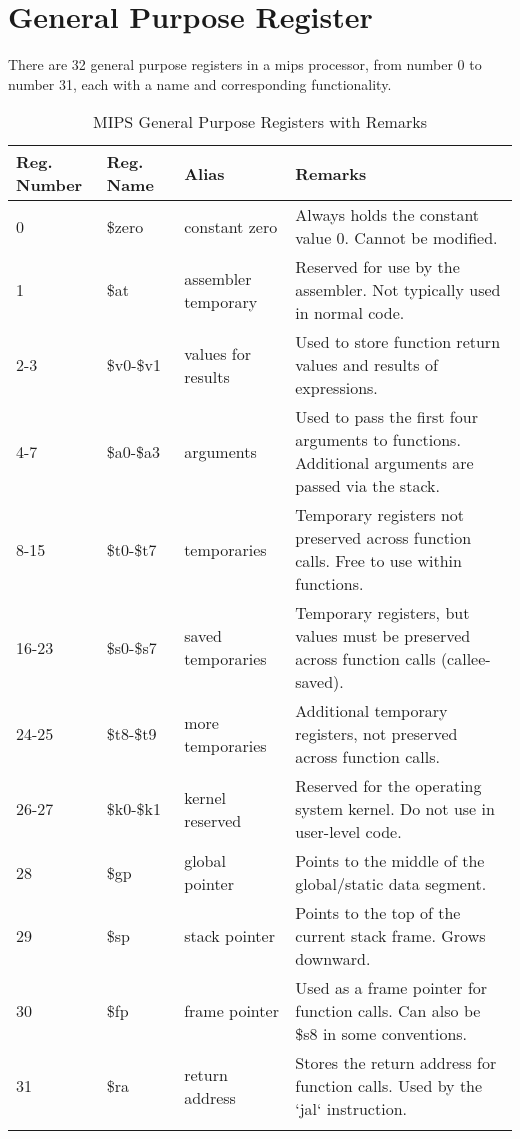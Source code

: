 \documentclass[12pt]{article}
\theoremstyle{definition}
\begin{document}
\section{General Purpose Register}
There are 32 general purpose registers in a mips processor, from number 0 to number 31, each with a name and corresponding functionality.

\begin{longtable}{|p{1.5cm}|p{2cm}|p{3cm}|p{7cm}|}
    \hline
    \textbf{Reg. Number} & \textbf{Reg. Name} & \textbf{Alias} & \textbf{Remarks} \\ 
    \hline
    0  & \$zero  & constant zero & Always holds the constant value 0. Cannot be modified. \\ 
    \hline
    1  & \$at    & assembler temporary & Reserved for use by the assembler. Not typically used in normal code. \\ 
    \hline
    2-3  & \$v0-\$v1  & values for results & Used to store function return values and results of expressions. \\ 
    \hline
    4-7  & \$a0-\$a3  & arguments & Used to pass the first four arguments to functions. Additional arguments are passed via the stack. \\ 
    \hline
    8-15  & \$t0-\$t7  & temporaries & Temporary registers not preserved across function calls. Free to use within functions. \\ 
    \hline
    16-23 & \$s0-\$s7  & saved temporaries & Temporary registers, but values must be preserved across function calls (callee-saved). \\ 
    \hline
    24-25 & \$t8-\$t9  & more temporaries & Additional temporary registers, not preserved across function calls. \\ 
    \hline
    26-27 & \$k0-\$k1  & kernel reserved & Reserved for the operating system kernel. Do not use in user-level code. \\ 
    \hline
    28    & \$gp       & global pointer & Points to the middle of the global/static data segment. \\ 
    \hline
    29    & \$sp       & stack pointer  & Points to the top of the current stack frame. Grows downward. \\ 
    \hline
    30    & \$fp       & frame pointer  & Used as a frame pointer for function calls. Can also be \$s8 in some conventions. \\ 
    \hline
    31    & \$ra       & return address & Stores the return address for function calls. Used by the `jal` instruction. \\ 
    \hline
    \caption{MIPS General Purpose Registers with Remarks}
    \end{longtable}
\end{document}
